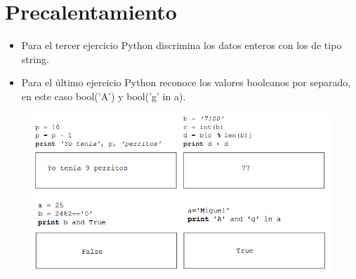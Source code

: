 \section{Precalentamiento}

\begin{itemize}
    \item Para el tercer ejercicio Python discrimina los datos enteros con los de tipo string.
    \item Para el último ejercicio Python reconoce los valores booleanos por separado, en este caso bool('A') y bool('g' in a).
\end{itemize} 

\begin{figure}[h]
\includegraphics{imagenes/pauta1.png}
\end{figure}
